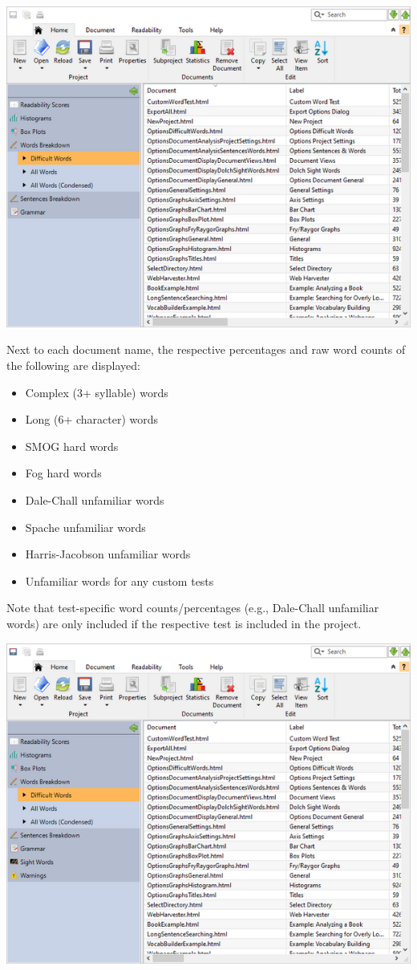 \documentclass[
]{book}
\providecommand{\tightlist}{%
  \setlength{\itemsep}{0pt}\setlength{\parskip}{0pt}}
\theoremstyle{definition}
\theoremstyle{definition}
\theoremstyle{definition}
\theoremstyle{definition}
\theoremstyle{remark}
\begin{document}
\includegraphics{Images/batchdifficultwords.png}

Next to each document name, the respective percentages and raw word counts of the following are displayed:

\begin{itemize}
\tightlist
\item
  Complex (3+ syllable) words
\item
  Long (6+ character) words
\item
  SMOG hard words
\item
  Fog hard words
\item
  Dale-Chall unfamiliar words
\item
  Spache unfamiliar words
\item
  Harris-Jacobson unfamiliar words
\item
  Unfamiliar words for any custom tests
\end{itemize}

Note that test-specific word counts/percentages (e.g., Dale-Chall unfamiliar words) are only included if the respective test is included in the project.

\includegraphics{Images/batchdifficultwordsverbose.png}
\end{document}
